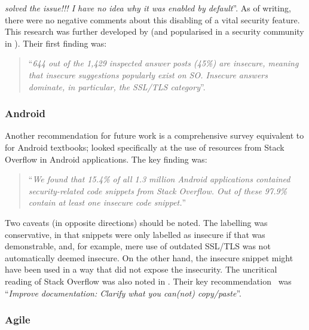 \documentclass[conference]{IEEEtran}
\begin{document}
{\emph{{solved the issue!!! I have no idea why it was enabled by default}}''. As of writing, there were no negative comments about this disabling of a vital security feature. This research was further developed by \cite{Chenetal2019a}  (and popularised in a security community in \cite{Zorz2019a}). Their first finding was:

\begin{quote}
``{\emph{644 out of the 1,429 inspected answer posts
(45\%) are insecure, meaning that insecure suggestions
popularly exist on SO. Insecure answers dominate, in
particular, the SSL/TLS category}}''.
\end{quote} 

\subsubsection{Android}\label{sec:Android}

Another recommendation for future work is a comprehensive survey equivalent to \cite{Drop2019} for Android textbooks; \cite{Fischeretal2017a} looked specifically at the use of resources from Stack Overflow in Android applications. The key finding was:

\begin{quote}
``{\emph{We found that 15.4\% of all 1.3 million Android applications
contained security-related code snippets from
Stack Overflow. Out of these 97.9\% contain at least one
insecure code snippet.}}''
\end{quote}

Two caveats (in opposite directions) should be noted. The labelling was conservative, in that snippets were only labelled as insecure if that was demonstrable, and, for example, mere use of outdated SSL/TLS was not automatically deemed insecure. On the other hand, the insecure snippet might have been used in a way that did not expose the insecurity. The uncritical reading of Stack Overflow was also noted in \cite[Slide 29]{Votipkaetal2019a}. Their key recommendation~\cite[Slide 32]{Votipkaetal2019a} was ``{\emph{Improve documentation: Clarify what you can(not) copy/paste}}''. 

\subsubsection{Agile}

}
\end{document}
